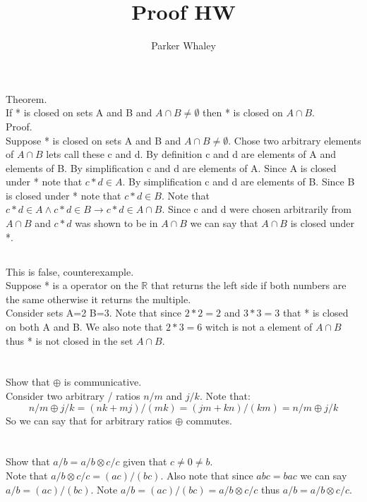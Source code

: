 \documentclass[12pt,a4paper]{article}
\author{Parker Whaley}
\title{Proof HW}
\begin{document}
\maketitle
\section{}
\subsection{}
Theorem.\\
If * is closed on sets A and B and $A \cap B \neq \emptyset$ then * is closed on $A \cap B$.\\
Proof.\\
Suppose * is closed on sets A and B and $A \cap B \neq \emptyset$.  Chose two arbitrary elements of $A \cap B$ lets call these c and d.  By definition c and d are elements of A and elements of B.  By simplification c and d are elements of A.  Since A is closed under * note that $c*d\in A$.  By simplification c and d are elements of B.  Since B is closed under * note that $c*d\in B$.  Note that $c*d\in A \wedge c*d \in B \rightarrow c*d\in A \cap B$.  Since c and d were chosen arbitrarily from $A \cap B$ and $c*d$ was shown to be in $A \cap B$ we can say that $A \cap B$ is closed under *.
\subsection{}
This is false, counterexample.\\
Suppose * is a operator on the $\mathbb{R}$ that returns the left side if both numbers are the same otherwise it returns the multiple.\\
Consider sets A={2} B={3}.  Note that since $2*2=2$ and $3*3=3$ that * is closed on both A and B.  We also note that $2*3=6$ witch is not a element of $A \cap B$ thus * is not closed in the set $A \cap B$.
\section{}
Show that $\oplus$ is communicative.\\
Consider two arbitrary / ratios $n/m$ and $j/k$.  Note that:
$$n/m \oplus j/k=(nk+mj)/(mk)=(jm+kn)/(km)=n/m\oplus j/k$$
So we can say that for arbitrary ratios $\oplus$ commutes.
\section{}
Show that $a/b=a/b\otimes c/c$ given that $c\neq 0\neq b$.\\
Note that $a/b\otimes c/c=(ac)/(bc)$.  Also note that since $abc=bac$ we can say $a/b=(ac)/(bc)$.  Note $a/b=(ac)/(bc)=a/b\otimes c/c$ thus $a/b=a/b\otimes c/c$.
\end{document}
